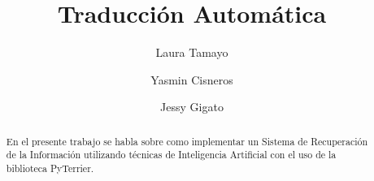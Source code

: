 \documentclass[runningheads]{llncs}
\begin{document}
\title{Traducción Automática}

\author{Laura Tamayo  \and 
Yasmin Cisneros \and 
Jessy Gigato}
\maketitle
\begin{abstract}
	En el presente trabajo se habla sobre como implementar un Sistema de Recuperación de la Información utilizando técnicas de Inteligencia Artificial con el uso de la biblioteca PyTerrier.
\end{abstract}
\end{document}
